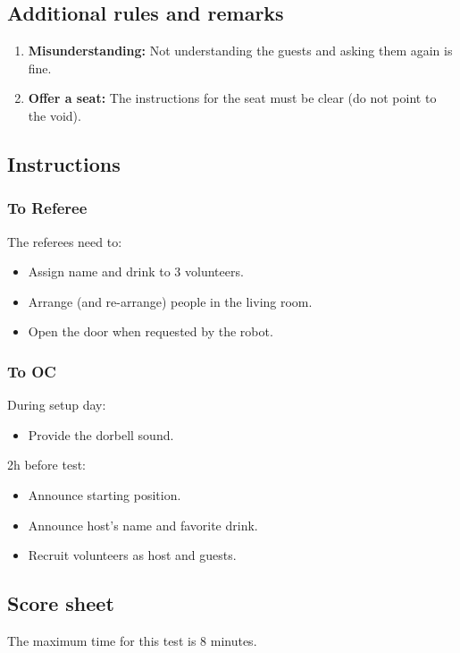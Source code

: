\subsection*{Additional rules and remarks}
\begin{enumerate}[nosep]
	\item \textbf{Misunderstanding:} Not understanding the guests and asking them again is fine.
	\item \textbf{Offer a seat:} The instructions for the seat must be clear (do not point to the void).
			
\end{enumerate}


\subsection*{Instructions}

\subsubsection*{To Referee}

The referees need to:
\begin{itemize}
	\item Assign name and drink to 3 volunteers.
	\item Arrange (and re-arrange) people in the living room.
	\item Open the door when requested by the robot.
\end{itemize}

\subsubsection*{To OC}

During setup day:
\begin{itemize}
	\item Provide the dorbell sound.
\end{itemize}

2h before test:
\begin{itemize}
	\item Announce starting position.
	\item Announce host's name and favorite drink.
	\item Recruit volunteers as host and guests.
\end{itemize}

\subsection*{Score sheet}
The maximum time for this test is 8 minutes.

